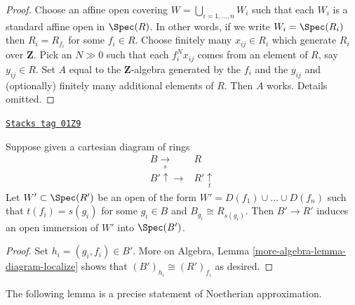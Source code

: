 \begin{proof}
Choose an affine open covering $W = \bigcup_{i = 1, \ldots, n} W_i$
such that each $W_i$ is a standard affine open in $\Spec(R)$.
In other words, if we write $W_i = \Spec(R_i)$
then $R_i = R_{f_i}$ for some $f_i \in R$.
Choose finitely many $x_{ij} \in R_i$ which generate
$R_i$ over $\mathbf{Z}$.
Pick an $N \gg 0$ such that each $f_i^Nx_{ij}$ comes from an
element of $R$, say $y_{ij} \in R$.
Set $A$ equal to the $\mathbf{Z}$-algebra generated by
the $f_i$ and the $y_{ij}$ and (optionally) finitely many
additional elements of $R$. Then $A$ works. Details omitted.
\end{proof}

\begin{lemma}[Diagram]
\label{limits-lemma-diagram}
\href{https://stacks.math.columbia.edu/tag/01Z9}{\texttt{Stacks tag 01Z9}}

Suppose given a cartesian diagram of rings
$$
\begin{array}{cc}B \underset{s}{\longrightarrow} & R \\ B'\uparrow\longrightarrow & R' \underset{t}{\uparrow}\end{array}
$$
Let $W' \subset \Spec(R')$ be an open of
the form $W' = D(f_1) \cup \ldots \cup D(f_n)$
such that $t(f_i) = s(g_i)$ for some $g_i \in B$
and $B_{g_i} \cong R_{s(g_i)}$. Then $B' \to R'$
induces an open immersion of $W'$ into $\Spec(B')$.
\end{lemma}

\begin{proof}
Set $h_i = (g_i, f_i) \in B'$. More on Algebra,
Lemma \ref{more-algebra-lemma-diagram-localize} shows that
$(B')_{h_i} \cong (R')_{f_i}$ as desired.
\end{proof}

The following lemma is a precise statement of Noetherian
approximation.

